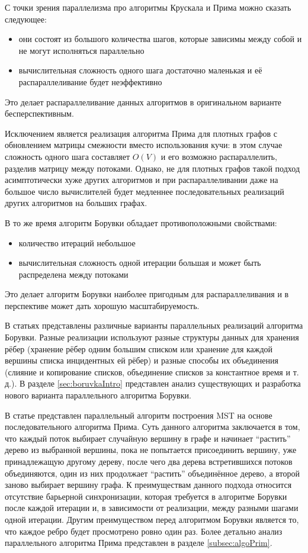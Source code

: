 \documentclass[a4paper,12pt]{extarticle}
\begin{document}
С точки зрения параллелизма про алгоритмы Крускала и Прима можно сказать следующее:
\begin{itemize}
	\item они состоят из большого количества шагов, которые зависимы между собой и не могут исполняться параллельно
	\item вычислительная сложность одного шага достаточно маленькая и её распараллеливание будет неэффективно
\end{itemize}
Это делает распараллеливание данных алгоритмов в оригинальном варианте бесперспективным. 

Исключением является реализация алгоритма Прима для плотных графов с обновлением матрицы смежности вместо использования кучи: в этом случае сложность одного шага составляет $O(V)$ и его возможно распараллелить, разделив матрицу между потоками.
Однако, не для плотных графов такой подход асимптотически хуже других алгоритмов и при распараллеливании даже на большое число вычислителей будет медленнее последовательных реализаций других алгоритмов на больших графах.

В то же время алгоритм Борувки обладает противоположными свойствами:
\begin{itemize}
	\item количество итераций небольшое
	\item вычислительная сложность одной итерации большая и может быть распределена между потоками
\end{itemize}
Это делает алгоритм Борувки наиболее пригодным для распараллеливания и в перспективе может дать хорошую масштабируемость.

В статьях \cite{dense-mst,boruvka-prima,boruvka-cm5} представлены различные варианты параллельных реализаций алгоритма Борувки.
Разные реализации используют разные структуры данных для хранения рёбер (хранение рёбер одним большим списком или хранение для каждой вершины списка инцидентных ей рёбер) и разные способы их объединения (слияние и копирование списков, объединение списков за константное время и т. д.).
В разделе \ref{sec:boruvkaIntro} представлен анализ существующих и разработка нового варианта параллельного алгоритма Борувки.

В статье \cite{boruvka-prima} представлен параллельный алгоритм построения MST на основе последовательного алгоритма Прима.
Суть данного алгоритма заключается в том, что каждый поток выбирает случайную вершину в графе и начинает ``растить'' дерево из выбранной вершины, пока не попытается присоединить вершину, уже принадлежащую другому дереву, после чего два дерева встретившихся потоков объединяются, один из них продолжает ``растить'' объединённое дерево, а второй заново выбирает вершину графа. %
К преимуществам данного подхода относится отсутствие барьерной синхронизации, которая требуется в алгоритме Борувки после каждой итерации и, в зависимости от реализации, между разными шагами одной итерации. Другим преимуществом перед алгоритмом Борувки является то, что каждое ребро будет просмотрено ровно один раз. Более детально анализ параллельного алгоритма Прима представлен в разделе \ref{subsec:algoPrim}.
\end{document}
